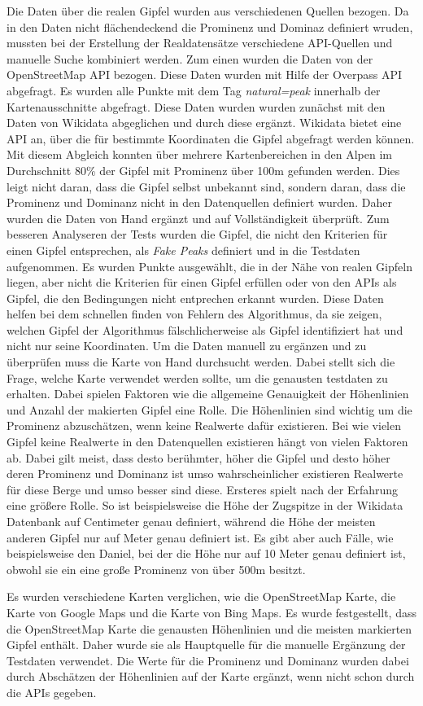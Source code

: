 Die Daten über die realen Gipfel wurden aus verschiedenen Quellen bezogen. Da in den Daten nicht flächendeckend  die Prominenz und Dominaz definiert wruden, mussten bei der Erstellung der Realdatensätze verschiedene API-Quellen und manuelle Suche kombiniert werden. Zum einen wurden die Daten von der OpenStreetMap API bezogen. Diese Daten wurden mit Hilfe der Overpass API abgefragt. Es wurden alle Punkte mit dem Tag \textit{natural=peak} innerhalb der Kartenausschnitte abgefragt. Diese Daten wurden wurden zunächst mit den Daten von Wikidata abgeglichen und durch diese ergänzt. Wikidata bietet eine API an, über die für bestimmte Koordinaten die Gipfel abgefragt werden können. Mit diesem Abgleich konnten über mehrere Kartenbereichen in den Alpen im Durchschnitt 80\% der Gipfel mit Prominenz über 100m gefunden werden. Dies leigt nicht daran, dass die Gipfel selbst unbekannt sind, sondern daran, dass die Prominenz und Dominanz nicht in den Datenquellen definiert wurden. Daher wurden die Daten von Hand ergänzt und auf Vollständigkeit überprüft. Zum besseren Analyseren der Tests wurden die Gipfel, die nicht den Kriterien für einen Gipfel entsprechen, als \textit{Fake Peaks} definiert und in die Testdaten aufgenommen. Es wurden Punkte ausgewählt, die in der Nähe von realen Gipfeln liegen, aber nicht die Kriterien für einen Gipfel erfüllen oder von den APIs als Gipfel, die den Bedingungen nicht entprechen erkannt wurden. Diese Daten helfen bei dem schnellen finden von Fehlern des Algorithmus, da sie zeigen, welchen Gipfel der Algorithmus fälschlicherweise als Gipfel identifiziert hat und nicht nur seine Koordinaten.
Um die Daten manuell zu ergänzen und zu überprüfen muss die Karte von Hand durchsucht werden. Dabei stellt sich die Frage, welche Karte verwendet werden sollte, um die genausten testdaten zu erhalten. Dabei spielen Faktoren wie die allgemeine Genauigkeit der Höhenlinien und Anzahl der makierten Gipfel eine Rolle. Die Höhenlinien sind wichtig um die Prominenz abzuschätzen, wenn keine Realwerte dafür existieren. Bei wie vielen Gipfel keine Realwerte in den Datenquellen existieren hängt von vielen Faktoren ab. Dabei gilt meist, dass desto berühmter, höher die Gipfel und desto höher deren Prominenz und Dominanz ist umso wahrscheinlicher existieren Realwerte für diese Berge und umso besser sind diese. Ersteres spielt nach der Erfahrung eine größere Rolle. So ist beispielsweise die Höhe der Zugspitze in der Wikidata Datenbank auf Centimeter genau definiert, während die Höhe der meisten anderen Gipfel nur auf Meter genau definiert ist. Es gibt aber auch Fälle, wie beispielsweise den Daniel, bei der die Höhe nur auf 10 Meter genau definiert ist, obwohl sie ein eine große Prominenz von über 500m besitzt.

Es wurden verschiedene Karten verglichen, wie die OpenStreetMap Karte, die Karte von Google Maps und die Karte von Bing Maps. Es wurde festgestellt, dass die OpenStreetMap Karte die genausten Höhenlinien und die meisten markierten Gipfel enthält. Daher wurde sie als Hauptquelle für die manuelle Ergänzung der Testdaten verwendet. Die Werte für die Prominenz und Dominanz wurden dabei durch Abschätzen der Höhenlinien auf der Karte ergänzt, wenn nicht schon durch die APIs gegeben.